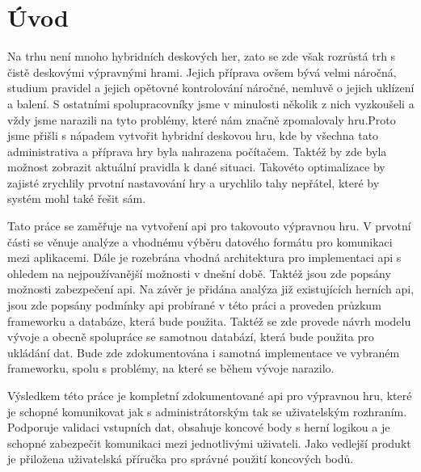 \chapter{Úvod}
Na trhu není mnoho hybridních deskových her, zato se zde však rozrůstá trh s čistě deskovými výpravnými hrami. Jejich příprava ovšem bývá velmi náročná, studium pravidel a jejich opětovné kontrolování náročné, nemluvě o jejich uklízení a balení. S ostatními spolupracovníky jsme v minulosti několik z nich vyzkoušeli a vždy jsme narazili na tyto problémy, které nám značně zpomalovaly hru.Proto jsme přišli s nápadem vytvořit hybridní deskovou hru, kde by všechna tato administrativa a příprava hry byla nahrazena počítačem. Taktéž by zde byla možnost zobrazit aktuální pravidla k dané situaci. Takovéto optimalizace by zajisté zrychlily prvotní nastavování hry a urychlilo tahy nepřátel, které by systém mohl také řešit sám. 

Tato práce se zaměřuje na vytvoření \gls{api} pro takovouto výpravnou hru. V prvotní části se věnuje analýze a vhodnému výběru datového formátu pro komunikaci mezi aplikacemi. Dále je rozebrána vhodná architektura pro implementaci \gls{api} s ohledem na nejpoužívanější možnosti v dnešní době. Taktéž jsou zde popsány možnosti zabezpečení \gls{api}. Na závěr je přidána analýza již existujících herních \gls{api}, jsou zde popsány podmínky \gls{api} probírané v této práci a proveden průzkum frameworku a databáze, která bude použita. Taktéž se zde provede návrh modelu vývoje a obecně spolupráce se samotnou databází, která bude použita pro ukládání dat. Bude zde zdokumentována i samotná implementace ve vybraném frameworku, spolu s problémy, na které se během vývoje narazilo.

Výsledkem této práce je kompletní zdokumentované \gls{api} pro výpravnou hru, které je schopné komunikovat jak s administrátorským tak se uživatelským rozhraním. Podporuje validaci vstupních dat, obsahuje koncové body s herní logikou a je schopné zabezpečit komunikaci mezi jednotlivými uživateli. Jako vedlejší produkt je přiložena uživatelská příručka pro správné použití koncových bodů.